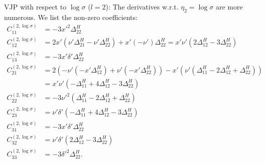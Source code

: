 \documentclass{article}
\begin{document}
VJP with respect to $\log \sigma$ ($l=2$):
The derivatives w.r.t. $\eta_2 = \log \sigma$ are more numerous.
We list the non-zero coefficients:
%
\begin{align}
  C^{(2,\log\sigma)}_{11} & = -3x'^2\Delta^H_{22} \\
  C^{(2,\log\sigma)}_{12} & = 2x'(\nu'\Delta^H_{21}-\nu'\Delta^H_{22}) + x'(-\nu')\Delta^H_{22} = x'\nu'(2\Delta^H_{12}-3\Delta^H_{22})                                                                                            \\
  C^{(2,\log\sigma)}_{13} & = -3x'\delta'\Delta^H_{22}                                                                                                                                                                             \\
  C^{(2,\log\sigma)}_{21} & = 2(-\nu'(-x'\Delta^H_{12}) + \nu'(-x'\Delta^H_{22})) -x'(\nu'(\Delta^H_{11}-2\Delta^H_{12}+\Delta^H_{22}))                                                                                            \\
                          & = x'\nu'(-\Delta^H_{11} + 4\Delta^H_{12} - 3\Delta^H_{22})                                                                                                                                             \\
  C^{(2,\log\sigma)}_{22} & = -3\nu'^2(\Delta^H_{11}-2\Delta^H_{12}+\Delta^H_{22})                                                                                                                                                 \\
  C^{(2,\log\sigma)}_{23} & = \nu'\delta'(-\Delta^H_{11} + 4\Delta^H_{12} - 3\Delta^H_{22})                                                                                                                                        \\
  C^{(2,\log\sigma)}_{31} & = -3x'\delta'\Delta^H_{22}                                                                                                                                                                             \\
  C^{(2,\log\sigma)}_{32} & = \nu'\delta'(2\Delta^H_{12}-3\Delta^H_{22})                                                                                                                                                           \\
  C^{(2,\log\sigma)}_{33} & = -3\delta'^2\Delta^H_{22}.
\end{align}
\end{document}
